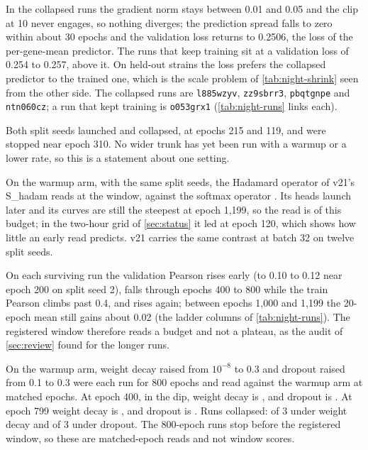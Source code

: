 In the collapsed runs the gradient norm stays between 0.01 and 0.05 and the clip at 10
never engages, so nothing diverges; the prediction spread falls to zero within about 30
epochs and the validation loss returns to 0.2506, the loss of the per-gene-mean predictor.
The runs that keep training sit at a validation loss of 0.254 to 0.257, above it. On
held-out strains the loss prefers the collapsed predictor to the trained one, which is the
scale problem of \cref{tab:night-shrink} seen from the other side. The collapsed runs are
\texttt{l885wzyv}, \texttt{zz9sbrr3}, \texttt{pbqtgnpe} and \texttt{ntn060cz}; a run that
kept training is \texttt{o053grx1} (\cref{tab:night-runs} links each).

 Both split seeds
launched and collapsed, at epochs 215 and 119, and were stopped near epoch 310. No wider
trunk has yet been run with a warmup or a lower rate, so this is a statement about one
setting.

 On the warmup
arm, with the same split seeds, the Hadamard operator of v21's S\_hadam reads
\nightHadamWindows{} at the window, against the softmax operator \nightHadamVsWarmup. Its
heads launch later and its curves are still the steepest at epoch 1{,}199, so the read is
of this budget; in the two-hour grid of \cref{sec:status} it led at epoch 120, which shows
how little an early read predicts. v21 carries the same contrast at batch 32 on twelve
split seeds.

 On each surviving run the
validation Pearson rises early (to 0.10 to 0.12 near epoch 200 on split seed 2), falls
through epochs 400 to 800 while the train Pearson climbs past 0.4, and rises again; between
epochs 1{,}000 and 1{,}199 the 20-epoch mean still gains about 0.02 (the ladder columns of
\cref{tab:night-runs}). The registered window therefore reads a budget and not a plateau,
as the audit of \cref{sec:review} found for the longer runs.

 On the warmup arm, weight decay raised from
$10^{-8}$ to 0.3 and dropout raised from 0.1 to 0.3 were each run for 800 epochs and read
against the warmup arm at matched epochs. At epoch 400, in the dip, weight decay is
\nightDecayVsWarmupEarly, and dropout is \nightDropVsWarmupEarly. At epoch 799 weight decay
is \nightDecayVsWarmupLate, and dropout is \nightDropVsWarmupLate. Runs collapsed:
\nightDecayCollapsed{} of 3 under weight decay and \nightDropCollapsed{} of 3 under dropout.
The 800-epoch runs stop before the registered window, so these are matched-epoch reads and
not window scores.


